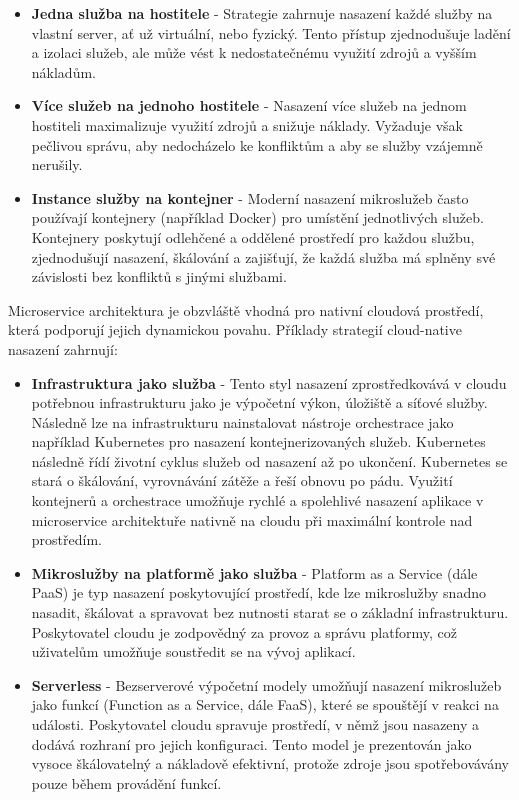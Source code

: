 \begin{itemize}
    \item \textbf{Jedna služba na hostitele} - Strategie zahrnuje nasazení každé služby na vlastní server, ať už virtuální, nebo fyzický. Tento přístup zjednodušuje ladění a izolaci služeb, ale může vést k nedostatečnému využití zdrojů a vyšším nákladům.
    \item \textbf{Více služeb na jednoho hostitele} - Nasazení více služeb na jednom hostiteli maximalizuje využití zdrojů a snižuje náklady. Vyžaduje však pečlivou správu, aby nedocházelo ke konfliktům a aby se služby vzájemně nerušily.
    \item \textbf{Instance služby na kontejner} - Moderní nasazení mikroslužeb často používají kontejnery (například Docker) pro umístění jednotlivých služeb. Kontejnery poskytují odlehčené a oddělené prostředí pro každou službu, zjednodušují nasazení, škálování a zajišťují, že každá služba má splněny své závislosti bez konfliktů s jinými službami.
\end{itemize}


Microservice architektura je obzvláště vhodná pro nativní cloudová prostředí, která podporují jejich dynamickou povahu. \cite{Garrison2017} Příklady strategií cloud-native nasazení zahrnují:

\begin{itemize}
    \item \textbf{Infrastruktura jako služba} - Tento styl nasazení zprostředkovává v cloudu potřebnou infrastrukturu jako je výpočetní výkon, úložiště a síťové služby. Následně lze na infrastrukturu nainstalovat nástroje orchestrace jako například Kubernetes pro nasazení kontejnerizovaných služeb. Kubernetes následně řídí životní cyklus služeb od nasazení až po ukončení. Kubernetes se stará o škálování, vyrovnávání zátěže a řeší obnovu po pádu. Využití kontejnerů a orchestrace umožňuje rychlé a spolehlivé nasazení aplikace v microservice architektuře nativně na cloudu při maximální kontrole nad prostředím.
    \item \textbf{Mikroslužby na platformě jako služba} - Platform as a Service (dále PaaS) je typ nasazení poskytovující prostředí, kde lze mikroslužby snadno nasadit, škálovat a spravovat bez nutnosti starat se o základní infrastrukturu. Poskytovatel cloudu je zodpovědný za provoz a správu platformy, což uživatelům umožňuje soustředit se na vývoj aplikací.
    \item \textbf{Serverless} - Bezserverové výpočetní modely umožňují nasazení mikroslužeb jako funkcí (Function as a Service, dále FaaS), které se spouštějí v reakci na události. Poskytovatel cloudu spravuje prostředí, v němž jsou nasazeny a dodává rozhraní pro jejich konfiguraci. Tento model je prezentován jako vysoce škálovatelný a nákladově efektivní, protože zdroje jsou spotřebovávány pouze během provádění funkcí. 
\end{itemize}